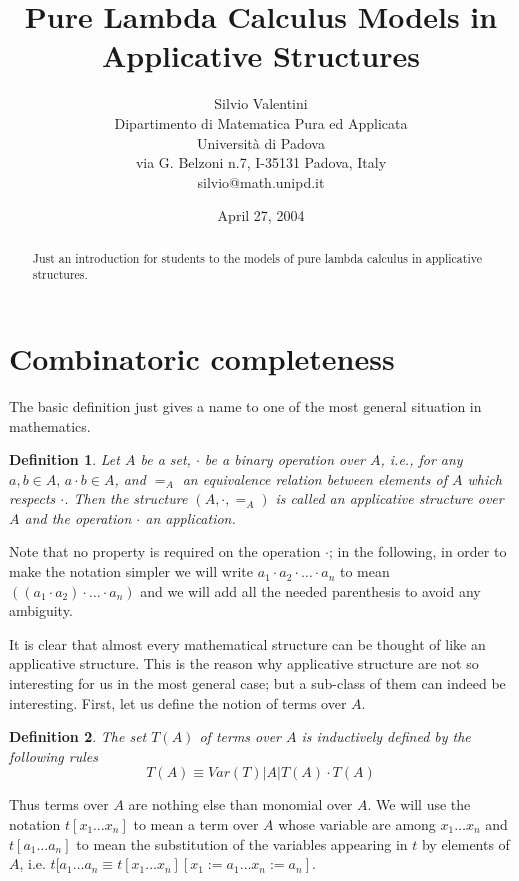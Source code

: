 \documentclass[a4paper,10pt]{article}
\author{Silvio Valentini\\
Dipartimento di Matematica Pura ed Applicata\\
Università di Padova\\
via G. Belzoni n.7, I-35131 Padova, Italy\\
silvio@math.unipd.it}
\title{Pure Lambda Calculus Models in Applicative Structures}
\date{April 27, 2004}
\newtheorem{definition}{Definition}
\begin{document}
\maketitle

\begin{abstract}
 Just an introduction for students to the models of pure lambda calculus in
applicative structures.
\end{abstract}

\section{Combinatoric completeness}
The basic definition just gives a name to one of the most general situation in
mathematics.

\begin{definition} Let $A$ be a set, $\cdot$ be a binary operation over $A$,
i.e., for any $a,b \in A,\, a \cdot b \in A$, and $=_A$ an equivalence relation
between elements of $A$ which respects $\cdot$. Then the structure $(A, \cdot,
=_A)$ is called an \emph{applicative structure} over $A$ and the operation
$\cdot$ an \emph{application}.
\end{definition}

Note that no property is required on the operation $\cdot$; in the following,
in order to make the notation simpler we will write $a_1 \cdot a_2 \cdot \dots
\cdot a_n$ to mean $((a_1 \cdot a_2) \cdot \dots \cdot a_n)$ and we will add
all the needed parenthesis to avoid any ambiguity.

It is clear that almost every mathematical structure can be thought of like an
applicative structure. This is the reason why applicative structure are not so
interesting for us in the most general case; but a sub-class of them can indeed
be interesting. First, let us define the notion of terms over $A$.

\begin{definition}
The set $T(A)$ of terms over $A$ is inductively defined by the following rules
$$T(A) \equiv Var(T) | A | T(A) \cdot T(A)$$
\end{definition}

Thus terms over $A$ are nothing else than monomial over $A$. We will use the
notation $t[x_1 \dots x_n]$ to mean a term over $A$ whose variable are among
$x_1 \dots x_n$ and $t[a_1 \dots a_n]$ to mean the substitution of the
variables appearing in $t$ by elements of $A$, i.e. $t[a_1 \dots a_n \equiv
t[x_1 \dots x_n][x_1:=a_1 \dots x_n:=a_n]$.
\end{document}
